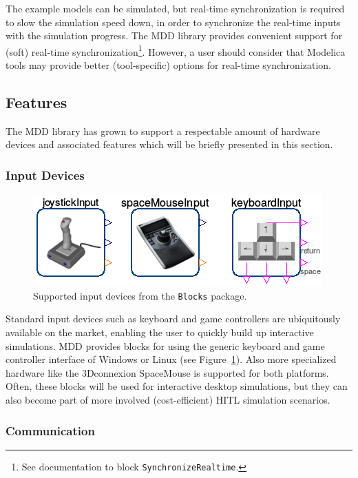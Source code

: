 \documentclass{resources/modelica}
\newcommand{\modelica}[1]{\lstinline[language=modelica]|#1|}
\begin{document}
The example models can be simulated, but real-time synchronization is
required to slow the simulation speed down, in order to synchronize the
real-time inputs with the simulation progress.
The MDD library provides convenient support for (soft) real-time
synchronization\footnote{See documentation to block
\mbox{\modelica{SynchronizeRealtime}.}
}.
However, a user should consider that Modelica tools may provide better (tool-specific) options for real-time synchronization.

\subsection{Features}

The MDD library has grown to support a respectable amount of hardware devices
and associated features which will be briefly presented in this section.

\subsubsection{Input Devices}
\begin{figure}[h]
  \centering
  \includegraphics[width=0.7\columnwidth]{figures/OverviewInputDevices}
  \caption{Supported input devices from the \modelica{Blocks} package.}
  \label{fig:OverviewInputDevices}
\end{figure}

\noindent
Standard input devices such as keyboard and game controllers are ubiquitously
available on the market, enabling the user to quickly build up interactive simulations.
MDD provides blocks for using the generic keyboard and game controller interface
of Windows or Linux (see Figure~\ref{fig:OverviewInputDevices}). Also more
specialized hardware like the 3Dconnexion SpaceMouse is supported for both platforms.
Often, these blocks will be used for interactive desktop simulations, but they
can also become part of more involved (cost-efficient) HITL simulation
scenarios.

\subsubsection{Communication}
\label{sec:Communication}
\end{document}
